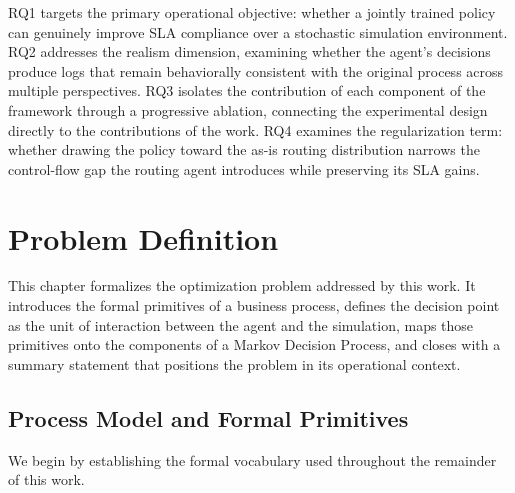 \documentclass[journal,onecolumn]{IEEEtran}
\begin{document}
RQ1 targets the primary operational objective: whether a jointly
trained policy can genuinely improve SLA compliance over a stochastic
simulation environment. RQ2 addresses the realism dimension,
examining whether the agent's decisions produce logs that remain
behaviorally consistent with the original process across multiple
perspectives. RQ3 isolates the contribution of each component of
the framework through a progressive ablation, connecting the
experimental design directly to the contributions of the work.
RQ4 examines the regularization term: whether drawing the policy
toward the as-is routing distribution narrows the control-flow gap
the routing agent introduces while preserving its SLA gains.

\section{Problem Definition}
\label{sec:problem_definition}

This chapter formalizes the optimization problem addressed by this
work. It introduces the formal primitives of a business process,
defines the decision point as the unit of interaction between the
agent and the simulation, maps those primitives onto the components
of a Markov Decision Process, and closes with a summary statement
that positions the problem in its operational context.

\subsection{Process Model and Formal Primitives}
\label{subsec:formal_primitives}

We begin by establishing the formal vocabulary used throughout the
remainder of this work.
\end{document}
